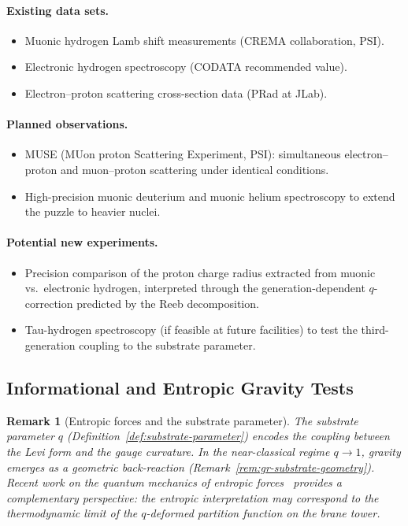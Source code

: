 \documentclass[12pt,a4paper]{report}
\newtheorem{remark}[theorem]{Remark}
\begin{document}
\paragraph{Existing data sets.}
\begin{itemize}
  \item Muonic hydrogen Lamb shift measurements (CREMA collaboration, PSI).
  \item Electronic hydrogen spectroscopy (CODATA recommended value).
  \item Electron--proton scattering cross-section data (PRad at JLab).
\end{itemize}

\paragraph{Planned observations.}
\begin{itemize}
  \item MUSE (MUon proton Scattering Experiment, PSI): simultaneous
        electron--proton and muon--proton scattering under identical
        conditions.
  \item High-precision muonic deuterium and muonic helium spectroscopy
        to extend the puzzle to heavier nuclei.
\end{itemize}

\paragraph{Potential new experiments.}
\begin{itemize}
  \item Precision comparison of the proton charge radius extracted from
        muonic vs.\ electronic hydrogen, interpreted through the
        generation-dependent $q$-correction predicted by the Reeb
        decomposition.
  \item Tau-hydrogen spectroscopy (if feasible at future facilities) to
        test the third-generation coupling to the substrate parameter.
\end{itemize}

\subsection{Informational and Entropic Gravity Tests}
\label{sec:entropic-gravity}

\begin{remark}[Entropic forces and the substrate parameter]
\label{rem:entropic-gravity}
The substrate parameter $q$ (Definition~\ref{def:substrate-parameter}) encodes
the coupling between the Levi form and the gauge curvature.  In the
near-classical regime $q \to 1$, gravity emerges as a geometric back-reaction
(Remark~\ref{rem:gr-substrate-geometry}).  Recent work on the quantum mechanics
of entropic forces~\cite{carney2025} provides a complementary perspective: the
entropic interpretation may correspond to the thermodynamic limit of the
$q$-deformed partition function on the brane tower.
\end{remark}
\end{document}
